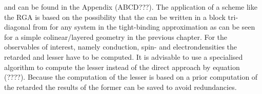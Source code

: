 and can be found in the Appendix (ABCD???).  The application of a scheme like the RGA is based on the possibility that the \hamil{} can be written in a block tri-diagonal from for any system in the tight-binding approximation as can be seen for a simple colinear/layered geometry in the previous chapter.
For the observables of interest, namely conduction, spin- and electrondensities the retarded and lesser \gfnc{} have to be computed.
It is advisable to use a specialised algorithm to compute the lesser \gfnc{} instead of the direct approach by equation (????). Because the computation of the lesser \gfnc{} is based on a prior computation of the retarded \gfnc{} the results of the former can be saved to avoid redundancies.

